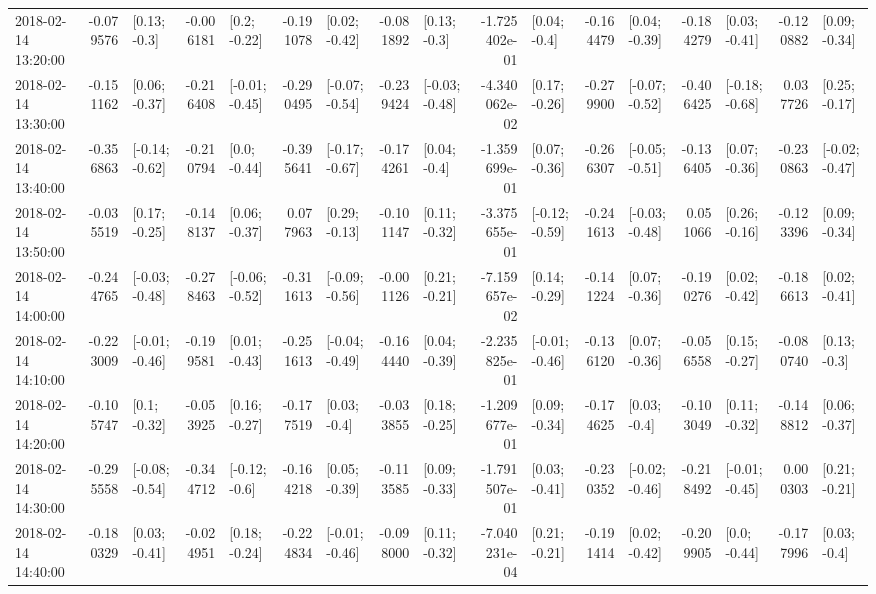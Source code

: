 \begin{tabular}{lrlrlrlrlrlrlrlrl}
2018-02-14 13:20:00 & -0.079576 &    [0.13; -0.3] & -0.006181 &    [0.2; -0.22] & -0.191078 &   [0.02; -0.42] & -0.081892 &    [0.13; -0.3] & -1.725402e-01 &    [0.04; -0.4] & -0.164479 &   [0.04; -0.39] & -0.184279 &   [0.03; -0.41] & -0.120882 &   [0.09; -0.34] \\
2018-02-14 13:30:00 & -0.151162 &   [0.06; -0.37] & -0.216408 &  [-0.01; -0.45] & -0.290495 &  [-0.07; -0.54] & -0.239424 &  [-0.03; -0.48] & -4.340062e-02 &   [0.17; -0.26] & -0.279900 &  [-0.07; -0.52] & -0.406425 &  [-0.18; -0.68] &  0.037726 &   [0.25; -0.17] \\
2018-02-14 13:40:00 & -0.356863 &  [-0.14; -0.62] & -0.210794 &    [0.0; -0.44] & -0.395641 &  [-0.17; -0.67] & -0.174261 &    [0.04; -0.4] & -1.359699e-01 &   [0.07; -0.36] & -0.266307 &  [-0.05; -0.51] & -0.136405 &   [0.07; -0.36] & -0.230863 &  [-0.02; -0.47] \\
2018-02-14 13:50:00 & -0.035519 &   [0.17; -0.25] & -0.148137 &   [0.06; -0.37] &  0.077963 &   [0.29; -0.13] & -0.101147 &   [0.11; -0.32] & -3.375655e-01 &  [-0.12; -0.59] & -0.241613 &  [-0.03; -0.48] &  0.051066 &   [0.26; -0.16] & -0.123396 &   [0.09; -0.34] \\
2018-02-14 14:00:00 & -0.244765 &  [-0.03; -0.48] & -0.278463 &  [-0.06; -0.52] & -0.311613 &  [-0.09; -0.56] & -0.001126 &   [0.21; -0.21] & -7.159657e-02 &   [0.14; -0.29] & -0.141224 &   [0.07; -0.36] & -0.190276 &   [0.02; -0.42] & -0.186613 &   [0.02; -0.41] \\
2018-02-14 14:10:00 & -0.223009 &  [-0.01; -0.46] & -0.199581 &   [0.01; -0.43] & -0.251613 &  [-0.04; -0.49] & -0.164440 &   [0.04; -0.39] & -2.235825e-01 &  [-0.01; -0.46] & -0.136120 &   [0.07; -0.36] & -0.056558 &   [0.15; -0.27] & -0.080740 &    [0.13; -0.3] \\
2018-02-14 14:20:00 & -0.105747 &    [0.1; -0.32] & -0.053925 &   [0.16; -0.27] & -0.177519 &    [0.03; -0.4] & -0.033855 &   [0.18; -0.25] & -1.209677e-01 &   [0.09; -0.34] & -0.174625 &    [0.03; -0.4] & -0.103049 &   [0.11; -0.32] & -0.148812 &   [0.06; -0.37] \\
2018-02-14 14:30:00 & -0.295558 &  [-0.08; -0.54] & -0.344712 &   [-0.12; -0.6] & -0.164218 &   [0.05; -0.39] & -0.113585 &   [0.09; -0.33] & -1.791507e-01 &   [0.03; -0.41] & -0.230352 &  [-0.02; -0.46] & -0.218492 &  [-0.01; -0.45] &  0.000303 &   [0.21; -0.21] \\
2018-02-14 14:40:00 & -0.180329 &   [0.03; -0.41] & -0.024951 &   [0.18; -0.24] & -0.224834 &  [-0.01; -0.46] & -0.098000 &   [0.11; -0.32] & -7.040231e-04 &   [0.21; -0.21] & -0.191414 &   [0.02; -0.42] & -0.209905 &    [0.0; -0.44] & -0.177996 &    [0.03; -0.4] \\

\end{tabular}
